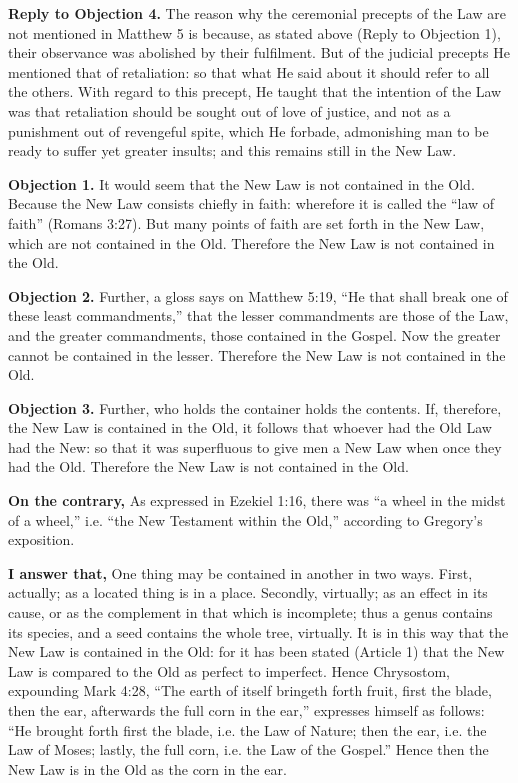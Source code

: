 \textbf{Reply to Objection 4.} The reason why the ceremonial precepts of the Law are not mentioned in Matthew 5 is because, as stated above (Reply to Objection 1), their observance was abolished by their fulfilment. But of the judicial precepts He mentioned that of retaliation: so that what He said about it should refer to all the others. With regard to this precept, He taught that the intention of the Law was that retaliation should be sought out of love of justice, and not as a punishment out of revengeful spite, which He forbade, admonishing man to be ready to suffer yet greater insults; and this remains still in the New Law.


\textbf{Objection 1.} It would seem that the New Law is not contained in the Old. Because the New Law consists chiefly in faith: wherefore it is called the ``law of faith'' (Romans 3:27). But many points of faith are set forth in the New Law, which are not contained in the Old. Therefore the New Law is not contained in the Old.

\textbf{Objection 2.} Further, a gloss says on Matthew 5:19, ``He that shall break one of these least commandments,'' that the lesser commandments are those of the Law, and the greater commandments, those contained in the Gospel. Now the greater cannot be contained in the lesser. Therefore the New Law is not contained in the Old.

\textbf{Objection 3.} Further, who holds the container holds the contents. If, therefore, the New Law is contained in the Old, it follows that whoever had the Old Law had the New: so that it was superfluous to give men a New Law when once they had the Old. Therefore the New Law is not contained in the Old.

\textbf{On the contrary,} As expressed in Ezekiel 1:16, there was ``a wheel in the midst of a wheel,'' i.e. ``the New Testament within the Old,'' according to Gregory's exposition.

\textbf{I answer that,} One thing may be contained in another in two ways. First, actually; as a located thing is in a place. Secondly, virtually; as an effect in its cause, or as the complement in that which is incomplete; thus a genus contains its species, and a seed contains the whole tree, virtually. It is in this way that the New Law is contained in the Old: for it has been stated (Article 1) that the New Law is compared to the Old as perfect to imperfect. Hence Chrysostom, expounding Mark 4:28, ``The earth of itself bringeth forth fruit, first the blade, then the ear, afterwards the full corn in the ear,'' expresses himself as follows: ``He brought forth first the blade, i.e. the Law of Nature; then the ear, i.e. the Law of Moses; lastly, the full corn, i.e. the Law of the Gospel.'' Hence then the New Law is in the Old as the corn in the ear.

